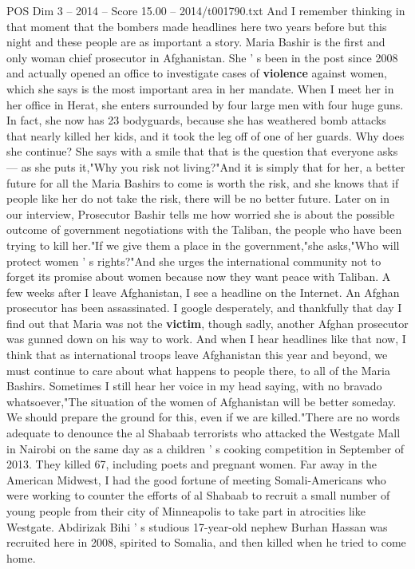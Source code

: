 \begin{textsample}{POS Dim 3 – 2014 – Score 15.00 – 2014/t001790.txt}
And I remember thinking in that moment that the bombers made headlines here two years before but this night and these people are as important a story.
Maria Bashir is the first and only woman chief prosecutor in Afghanistan.
She ' s been in the post since 2008 and actually opened an office to investigate cases of \textbf{violence} against women, which she says is the most important area in her mandate.
When I meet her in her office in Herat, she enters surrounded by four large men with four huge guns.
In fact, she now has 23 bodyguards, because she has weathered bomb attacks that nearly killed her kids, and it took the leg off of one of her guards.
Why does she continue?
She says with a smile that that is the question that everyone asks — as she puts it,"Why you risk not living?"And it is simply that for her, a better future for all the Maria Bashirs to come is worth the risk, and she knows that if people like her do not take the risk, there will be no better future.
Later on in our interview, Prosecutor Bashir tells me how worried she is about the possible outcome of government negotiations with the Taliban, the people who have been trying to kill her."If we give them a place in the government,"she asks,"Who will protect women ' s rights?"And she urges the international community not to forget its promise about women because now they want peace with Taliban.
A few weeks after I leave Afghanistan, I see a headline on the Internet.
An Afghan prosecutor has been assassinated.
I google desperately, and thankfully that day I find out that Maria was not the \textbf{victim}, though sadly, another Afghan prosecutor was gunned down on his way to work.
And when I hear headlines like that now, I think that as international troops leave Afghanistan this year and beyond, we must continue to care about what happens to people there, to all of the Maria Bashirs.
Sometimes I still hear her voice in my head saying, with no bravado whatsoever,"The situation of the women of Afghanistan will be better someday.
We should prepare the ground for this, even if we are killed."There are no words adequate to denounce the al Shabaab terrorists who attacked the Westgate Mall in Nairobi on the same day as a children ' s cooking competition in September of 2013.
They killed 67, including poets and pregnant women.
Far away in the American Midwest, I had the good fortune of meeting Somali-Americans who were working to counter the efforts of al Shabaab to recruit a small number of young people from their city of Minneapolis to take part in atrocities like Westgate.
Abdirizak Bihi ' s studious 17-year-old nephew Burhan Hassan was recruited here in 2008, spirited to Somalia, and then killed when he tried to come home.

\end{textsample}
